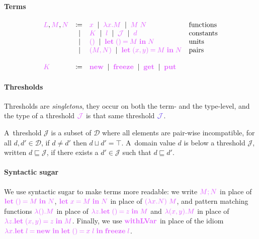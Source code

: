 \documentclass[main.tex]{subfiles}
\begin{document}
\paragraph*{Terms}
\[
  \begin{array}{lrll}
  \tm{L}, \tm{M}, \tm{N}
  & \coloneqq & \tm{x}
    \sep        \tm{\lambda x.M}
    \sep        \tm{M\;N}                     & \text{functions} \\
  & \sep      & \tm{K}                        
    \sep        \tm{l}
    \sep        \tmJ
    \sep        \tm{d}                        & \text{constants} \\
  & \sep      & \tm{\unit}                    
    \sep        \tm{\letunit{M}{N}}           & \text{units} \\
  & \sep      & \tm{\pair{M}{N}}              
    \sep        \tm{\letpair{x}{y}{M}{N}}     & \text{pairs}
  \\
  \\
  \tm{K}
  & \coloneqq & \tm{\lvarnew}
    \sep        \tm{\lvarfreeze}
    \sep        \tm{\lvarget}
    \sep        \tm{\lvarput}
\end{array}
\]

\paragraph*{Thresholds}
Thresholds are \emph{singletons}, \ie they occur on both the term- and the type-level, and the type of a threshold $\tmJ$ is that same threshold $\tyJ$. 

A~threshold $\mathcal{J}$ is a subset of $\mathcal{D}$ where all elements are pair-wise incompatible, \ie for all $d,d'\in\mathcal{D}$, if ${d}\neq{d'}$ then ${d}\sqcup{d'}={\top}$.
A~domain value $d$ is below a threshold $\mathcal{J}$, written ${d}\sqsubseteq\mathcal{J}$, if there exists a ${d'}\in\mathcal{J}$ such that ${d}\sqsubseteq{d'}$.

\paragraph*{Syntactic sugar}
We use syntactic sugar to make terms more readable: we write $\tm{\andthen{M}{N}}$ in place of $\tm{\letunit{M}{N}}$, $\tm{\letbind{x}{M}{N}}$ in place of $\tm{(\lambda x.N)\;M}$, and pattern matching functions $\tm{\lambda\unit.M}$ in place of $\tm{\lambda z.\letunit{z}{M}}$ and $\tm{\lambda\pair{x}{y}.M}$ in place of $\tm{\lambda z.\letpair{x}{y}{z}{M}}$. Finally, we use $\tm{\lvarrun}$ in place of the idiom $\tm{\lambda x.\letbind{l}{\lvarnew}{\letunit{x\;l}{\lvarfreeze\;l}}}$.
\end{document}
